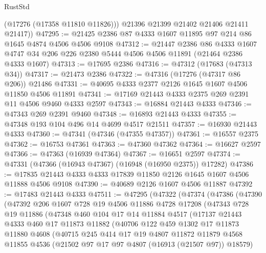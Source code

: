 \begin{lexlean}{RustStd}
\begin{coremodule}
          (@17276 (@17358 @11810 @11826)))
        @21396
        @21399
        @21402
        @21406
        @21411
        @21417))
@47295 := @21425 @2386 @87 @4333 @1607 @11895 @97 @214 @86 @1645 @4874 @4506 @4506 @9108
@47312 := @21447
    @2386
    @86
    @4333
    @1607
    @4747
    @34
    @206
    @226
    @2380
    @5444
    @4506
    @4506
    @11891
    (@21464 @2386 @4333 @1607)
@47313 := @17695 @2386
@47316 := @47312 (@17683 (@47313 @34))
@47317 := @21473 @2386
@47322 := @47316 (@17276 (@47317 @86 @206)) @21486
@47331 := @40695 @4333 @2377 @2126 @1645 @1607 @4506 @11850 @4506 @11891
@47341 := @17169 @21443 @4333 @2375 @269 @2391 @11 @4506 @9460 @4333 @2597
@47343 := @16884 @21443 @4333
@47346 := @47343 @269 @2391 @9460
@47348 := @16893 @21443 @4333
@47355 := @47348 @193 @104 @496 @14 @4699 @4517 @21511
@47357 := @16930 @21443 @4333
@47360 := @47341 (@47346 (@47355 @47357))
@47361 := @16557 @2375
@47362 := @16753 @47361
@47363 := @47360 @47362
@47364 := @16627 @2597
@47366 := @47363 (@16939 @47364)
@47367 := @16651 @2597
@47374 := @47331 (@47366 (@16943 @47367) (@16948 (@16950 @2375)) @17282)
@47386 := @17835 @21443 @4333 @4333 @17839 @11850 @2126 @1645 @1607 @4506 @11888 @4506 @9108
@47390 := @40689 @2126 @1607 @4506 @11887
@47392 := @17483 @21443 @4333
@47511 := @47295
    (@47322
      (@47374
        (@47386
          (@47390
            (@47392
              @206
              @1607
              @728
              @19
              @4506
              @11886
              @4728
              @17208
              (@47343
                @728
                @19
                @11886
                (@47348
                  @460
                  @104
                  @17
                  @14
                  @11884
                  @4517
                  (@17137
                    @21443
                    @4333
                    @460
                    @17
                    @11873
                    @11882
                    (@40706
                      @122
                      @459
                      @1302
                      @17
                      @11873
                      @11880
                      @4608
                      (@40715
                        @245
                        @414
                        @17
                        @19
                        @4807
                        @11872
                        @11879
                        @4568
                        @11855
                        @4536
                        (@21502 @97 @17 @97 @4807 (@16913 (@21507 @97)) @18579)

\end{coremodule}
\end{lexlean}
